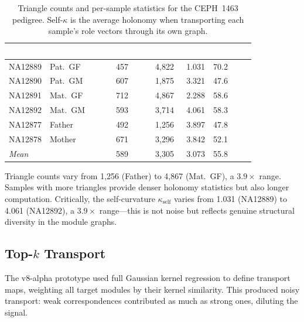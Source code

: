\documentclass{../yalumba}
\begin{document}
\begin{table}[H]
  \centering
  \tablestyle
  \caption{Triangle counts and per-sample statistics for the CEPH~1463
    pedigree.  Self-$\kappa$ is the average holonomy when transporting
    each sample's role vectors through its own graph.}
  \label{tab:persample}
  \begin{tabular}{llrrrl}
    \toprule
    \rowcolor{table-header}
    \textcolor{white}{\textbf{Sample}} &
    \textcolor{white}{\textbf{Relation}} &
    \textcolor{white}{\textbf{Modules}} &
    \textcolor{white}{\textbf{Triangles}} &
    \textcolor{white}{\textbf{Self-$\kappa$}} &
    \textcolor{white}{\textbf{Prep (s)}} \\
    \midrule
    NA12889 & Pat.~GF & 457 & 4{,}822 & 1.031 & 70.2 \\
    NA12890 & Pat.~GM & 607 & 1{,}875 & 3.321 & 47.6 \\
    NA12891 & Mat.~GF & 712 & 4{,}867 & 2.288 & 58.6 \\
    NA12892 & Mat.~GM & 593 & 3{,}714 & 4.061 & 58.3 \\
    NA12877 & Father  & 492 & 1{,}256 & 3.897 & 47.8 \\
    NA12878 & Mother  & 671 & 3{,}296 & 3.842 & 52.1 \\
    \midrule
    \multicolumn{2}{l}{\textit{Mean}} & 589 & 3{,}305 & 3.073 & 55.8 \\
    \bottomrule
  \end{tabular}
\end{table}

Triangle counts vary from 1{,}256 (Father) to 4{,}867 (Mat.~GF), a $3.9\times$
range.  Samples with more triangles provide denser holonomy statistics but
also longer computation.  Critically, the self-curvature $\kappa_{\text{self}}$
varies from 1.031 (NA12889) to 4.061 (NA12892), a $3.9\times$ range---this
is not noise but reflects genuine structural diversity in the module graphs.

\subsection{Top-$k$ Transport}
\label{sec:topk}

The v8-alpha prototype used full Gaussian kernel regression to define
transport maps, weighting all target modules by their kernel similarity.
This produced noisy transport: weak correspondences contributed as much as
strong ones, diluting the signal.
\end{document}
